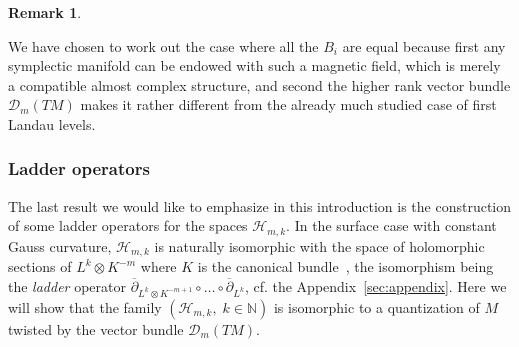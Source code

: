 \documentclass[10pt,a4paper]{article}
\theoremstyle{definition}
\newtheorem{rema}[theo]{Remark}
\numberwithin{equation}{section}
\newcommand{\N}{{\mathbb{N}}}
\newcommand{\con}{\overline}
\newcommand{\D}{\mathcal{D}}
\newcommand{\Hilb}{\mathcal{H}}
\begin{document}
\begin{rema}
\begin{enumerate}
We have chosen to work out the case where all the $B_i$ are equal because first any symplectic manifold can be endowed with such a magnetic field, which is merely a compatible almost complex structure, and second the higher rank vector bundle $\D_m (TM)$ makes it rather different from the already much studied case of first Landau levels.
\end{enumerate}

\end{rema}

\subsubsection{Ladder operators}

The last result we would like to emphasize in this introduction is the construction of some ladder operators for the spaces $\Hilb_{m,k}$. In the surface case with constant Gauss curvature, $\Hilb_{m,k}$ is naturally isomorphic with the space of holomorphic sections of $L^k \otimes K^{-m}$ where $K$ is the canonical bundle~\cite{Te06}, the isomorphism being the \emph{ladder} operator $\con{\partial}_{L^k \otimes K^{-m+1}} \circ \ldots
\circ \con{\partial}_{L^k}$, cf. the Appendix~\ref{sec:appendix}. Here we will show that the family $(\Hilb_{m,k}, \; k \in \N)$ is isomorphic to a quantization of $M$ twisted by the vector bundle $\D_m (TM) $.
\end{document}

